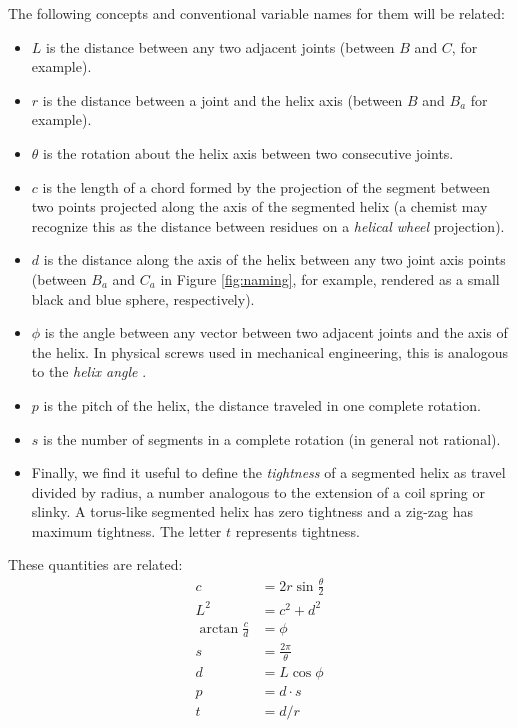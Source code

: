 \documentclass[11pt]{article}
\begin{document}
{The following concepts and conventional variable names for them will be related:
\begin{itemize}
\item $L$ is the distance between any two adjacent joints (between $B$ and $C$, for example).
  \item $r$ is the distance between a joint and the helix axis (between $B$ and $B_a$ for example).
  \item $\theta$ is the rotation about the helix axis between two consecutive joints.
  \item $c$ is the length of a chord formed by the projection of the segment between two points projected along the axis of the segmented helix (a chemist may recognize this as the distance between residues on a {\em helical wheel} projection).
  \item $d$ is the distance along the axis of the helix between any two joint axis points (between $B_a$ and $C_a$ in Figure \ref{fig:naming}, for example, rendered as a small black and blue
    sphere, respectively).
\item $\phi$ is the angle between any vector between two adjacent joints and the axis of the helix. In physical screws used in mechanical engineering, this is analogous to the {\em helix angle} \cite{wiki:helixangle}.
  \item $p$ is the pitch of the helix, the distance traveled in one complete rotation.
  \item $s$ is the number of segments in a complete rotation (in general not rational).
\item  Finally, we find it useful to define the {\em tightness} of a segmented helix
as travel divided by radius, a number
analogous to the extension of a coil spring or slinky.
A torus-like segmented helix has zero tightness and a zig-zag has
maximum tightness. The letter $t$ represents tightness.

  \end{itemize}
These quantities are related:
\begin{align}
    c &= 2r\sin{\frac{\theta}{2}} \\
    L^2 &= c^2+d^2  \\
    \arctan{\frac{c}{d}}  &= \phi \\
    s &= \frac{2 \pi}{\theta} \\
    d &= L \cos{\phi} \\
    p &= d \cdot s \\
    t &= d / r
\end{align}

}
\end{document}
